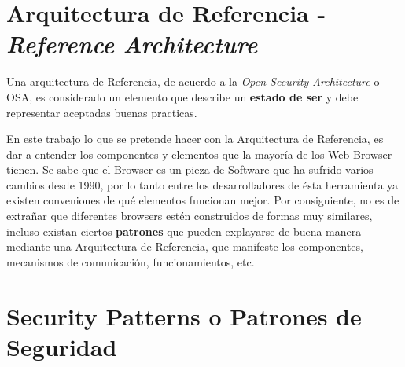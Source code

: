 \section{Arquitectura de Referencia - \textit{Reference Architecture}}

Una arquitectura de Referencia, de acuerdo a la \textit{Open Security Architecture} o OSA\cite{openSecArch}, es considerado un elemento que describe un \textbf{estado de ser} y debe representar aceptadas buenas practicas. 

En este trabajo lo que se pretende hacer con la Arquitectura de Referencia, es dar a entender los componentes y elementos que la mayoría de los Web Browser tienen. Se sabe que el Browser es un pieza de Software que ha sufrido varios cambios desde 1990, por lo tanto entre los desarrolladores de ésta herramienta ya existen conveniones de qué elementos funcionan mejor. Por consiguiente, no es de extrañar que diferentes browsers estén construidos de formas muy similares, incluso existan ciertos \textbf{patrones} que pueden explayarse de buena manera mediante una Arquitectura de Referencia, que manifeste los componentes, mecanismos de comunicación, funcionamientos, etc.

\section{Security Patterns o Patrones de Seguridad}

